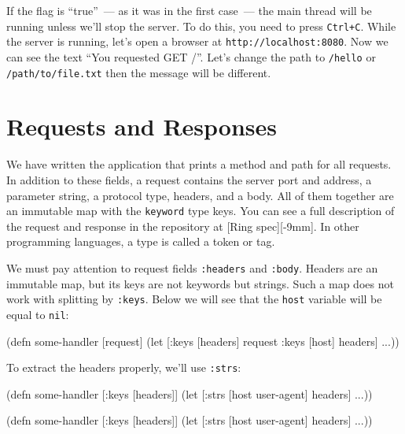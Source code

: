 \fi

If the flag is ``true''{}~--- as it was in the first case~--- the main thread will be running unless we'll stop the server. To do this, you need to press \verb|Ctrl+C|. While the server is running, let's open a browser at \verb|http://localhost:8080|. Now we can see the text ``You requested GET /''.  Let's change the path to \verb|/hello| or
\verb|/path/to/file.txt| then the message will be different.

\section{Requests and Responses}

We have written the application that prints a method and path for all requests. In addition to these fields, a request contains the server port and address, a parameter string, a protocol type, headers, and a body. All of them together are an immutable map with the \verb|keyword| type keys. You can see a full description of the request and response in the repository at [Ring spec][-9mm].
In other programming languages, a type is called a token or tag.


We must pay attention to request fields \verb|:headers| and \verb|:body|. Headers are an immutable map, but its keys are not keywords but strings. Such a map does not work with splitting by \verb|:keys|. Below we will see that the \verb|host| variable will be equal to \verb|nil|:


\begin{clojure}
(defn some-handler
  [request]
  (let [{:keys [headers]} request
        {:keys [host]} headers]
    ...))
\end{clojure}


To extract the headers properly, we'll use \verb|:strs|:

\ifx\DEVICETYPE\MOBILE

\begin{clojure}
(defn some-handler
  [{:keys [headers]}]
  (let [{:strs [host
                user-agent]} headers]
    ...))
\end{clojure}

\else

\begin{clojure}
(defn some-handler
  [{:keys [headers]}]
  (let [{:strs [host user-agent]} headers]
    ...))
\end{clojure}

